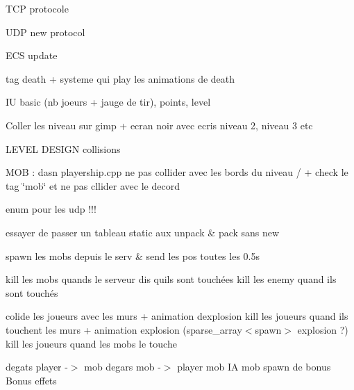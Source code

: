 
\begin{DoxyItemize}
\item TCP protocole
\item UDP new protocol
\item ECS update
\end{DoxyItemize}



\begin{DoxyItemize}
\item tag death + systeme qui play les animations de death
\item IU basic (nb joeurs + jauge de tir), points, level
\item Coller les niveau sur gimp + ecran noir avec ecris niveau 2, niveau 3 etc
\item LEVEL DESIGN collisions
\item MOB \+: dasn playership.\+cpp ne pas collider avec les bords du niveau / + check le tag \char`\"{}mob\char`\"{} et ne pas cllider avec le decord
\item enum pour les udp !!!
\item essayer de passer un tableau static aux unpack \& pack sans new
\end{DoxyItemize}


spawn les mobs depuis le serv \& send les pos toutes les 0.\+5s


kill les mobs quands le serveur dis qu\textquotesingle{}ils sont touchées kill les enemy quand ils sont touchés

colide les joueurs avec les murs + animation d\textquotesingle{}explosion kill les joueurs quand ils touchent les murs + animation explosion (sparse\+\_\+array$<$spawn$>$ explosion ?) kill les joueurs quand les mobs le touche

degats player -\/$>$ mob degars mob -\/$>$ player mob IA mob spawn de bonus Bonus effets 